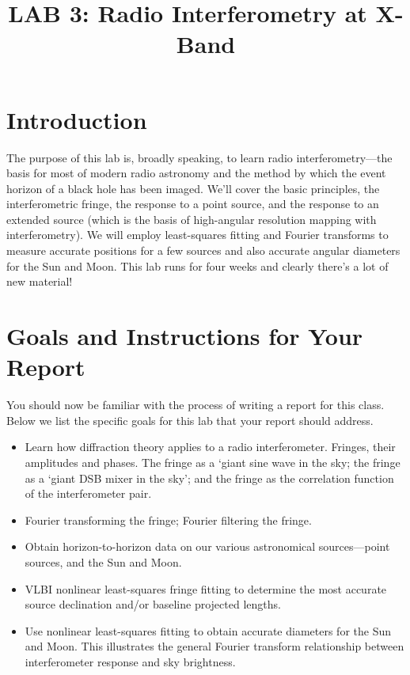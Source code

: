\documentclass[11pt,preprint]{aastex}
\begin{document}
\def\simlt{\lower.5ex\hbox{$\; \buildrel < \over \sim \;$}}
\def\simgt{\lower.5ex\hbox{$\; \buildrel > \over \sim \;$}}


\title {LAB 3: Radio Interferometry at X-Band}

\tableofcontents

\section{Introduction}

\noindent
The purpose of this lab is, broadly speaking, to learn radio
interferometry---the basis for most of modern radio astronomy and
the method by which the event horizon of a black hole has been imaged. 
We'll cover the
basic principles, the interferometric fringe, the response to a point
source, and the response to an extended source (which is the basis of
high-angular resolution mapping with interferometry). We will employ
least-squares fitting and Fourier transforms to measure accurate
positions for a few sources and also accurate angular diameters for the
Sun and Moon. This lab runs for four weeks and clearly there's a lot of new
material!

\section{Goals and Instructions for Your Report}

\noindent
You should now be familiar with the process of writing a report
for this class. Below we list the specific goals for this lab that
your report should address.

\begin{itemize}

\item Learn how diffraction theory applies to a radio
  interferometer. Fringes, their amplitudes and phases. The fringe as a
  `giant sine wave in the sky; the fringe as a `giant DSB mixer in
  the sky'; and the fringe as the correlation function of the
  interferometer pair.

\item Fourier transforming the fringe; Fourier filtering the fringe.

\item Obtain horizon-to-horizon data on our various astronomical
  sources---point sources, and the Sun and Moon.

\item VLBI nonlinear least-squares fringe fitting to determine the most
  accurate source declination and/or baseline projected lengths.

\item Use nonlinear least-squares fitting to obtain accurate diameters
  for the Sun and Moon. This illustrates the general Fourier transform
  relationship between interferometer response and sky brightness.

\end{itemize}
\end{document}
